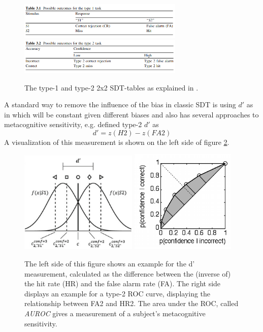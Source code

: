 \documentclass[../main/main.tex]{subfiles}
\begin{document}
	\begin{figure}[H]
		\centering
		\captionsetup{justification=centering}
		\includegraphics[width=0.7\textwidth]{../assets/type1_sdt_table.png}
		\includegraphics[width=0.7\textwidth]{../assets/type2_sdt_table.png}
		\caption{The type-1 and type-2 2x2 SDT-tables as explained in \cite{fleming2014measure}.} 
		\label{fig:tables}
	\end{figure}
	A standard way to remove the influence of the bias in classic SDT is using $d'$ as in \cite{green1966signal} which will be constant given different biases and also has several approaches to metacognitive sensitivity, e.g. \cite{kunimoto2001confidence} defined type-2 $d'$ as
	\begin{displaymath}
		d' = z(H2) - z(FA2)
	\end{displaymath}
	A visualization of this measurement is shown on the left side of figure \ref{fig:d_dash_and_roc}.
	\begin{figure}[H]
		\centering
		\captionsetup{justification=centering}
		\includegraphics[width=0.5\textwidth]{../assets/d_dash.png}
		\includegraphics[width=0.45\textwidth]{../assets/type1_roc.png}
		\caption{The left side of this figure shows an example for the d' measurement, calculated as the difference between the (inverse of) the hit rate (HR) and the false alarm rate (FA). The right side displays an example for a type-2 ROC curve, displaying the relationship between FA2 and HR2. The area under the ROC, called \textit{AUROC} gives a measurement of a subject's metacognitive sensitivity.} 
		\label{fig:d_dash_and_roc}
	\end{figure}
\end{document}
